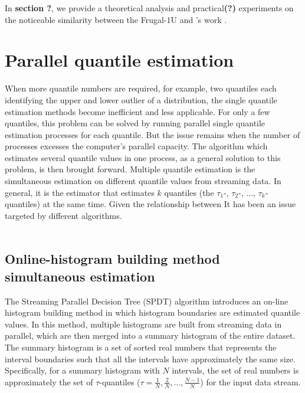 \documentclass[12pt]{article}
\begin{document}
    In \textbf{section ?}, we provide a theoretical analysis and practical\textbf{(?)} experiments on the noticeable similarity between the Frugal-1U and \citeauthor{yazidiQuantileEstimationDynamic2016}'s work . 

    
    \pagebreak
    \section{Parallel quantile estimation}
    When more quantile numbers are required, for example, two quantiles each identifying the upper and lower outlier of a distribution, the single quantile estimation methods become inefficient and less applicable.
    For only a few quantiles, this problem can be solved by running parallel single quantile estimation processes for each quantile. But the issue remains when the number of processes excesses the computer's parallel capacity.
    The algorithm which estimates several quantile values in one process, as a general solution to this problem, is then brought forward.
    Multiple quantile estimation is the simultaneous estimation on different quantile values from streaming data. 
    In general, it is the estimator that estimates $k$ quantiles (the $\tau_1$-, $\tau_2$-, $...$, $\tau_k$-quantiles) at the same time.
    Given the relationship between 
    It has been an issue targeted by different algorithms.\\\\

    \subsection{Online-histogram building method simultaneous estimation\cite{ben-haimStreamingParallelDecision}}
    The Streaming Parallel Decision Tree (SPDT) algorithm \cite{ben-haimStreamingParallelDecision} introduces an on-line histogram building method %
    in which histogram boundaries are estimated quantile values.
    In this method, multiple histograms are built from streaming data in parallel, which are then merged into a summary histogram of the entire dataset. The summary histogram is a set of sorted real numbers that represents the interval boundaries such that all the intervals have approximately the same size. Specifically, for a summary histogram with $N$ intervals, the set of real numbers is approximately the set of $\tau$-quantiles ($\tau = \frac{1}{N}, \frac{2}{N}, ..., \frac{N-1}{N}$) for the input data stream.
\end{document}
